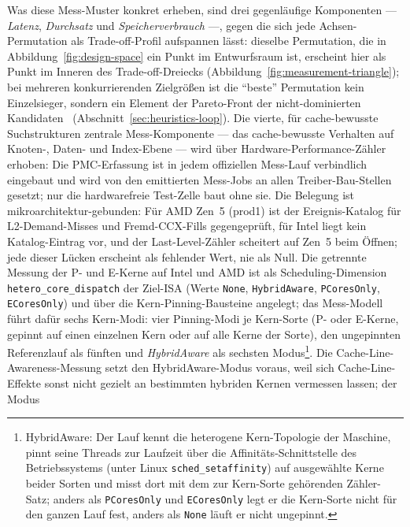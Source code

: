 \begin{nurlang}
Was diese Mess-Muster konkret erheben, sind drei gegenläufige Komponenten --- \emph{Latenz},
\emph{Durchsatz} und \emph{Speicherverbrauch} ---, gegen die sich jede Achsen-Permutation als
Trade-off-Profil aufspannen lässt: dieselbe Permutation, die in Abbildung~\ref{fig:design-space} ein Punkt
im Entwurfsraum ist, erscheint hier als Punkt im Inneren des Trade-off-Dreiecks
(Abbildung~\ref{fig:measurement-triangle}); bei mehreren konkurrierenden Zielgrößen ist die
\enquote{beste} Permutation kein Einzelsieger, sondern ein Element der Pareto-Front der
nicht-dominierten Kandidaten~\cite{ehrgott2005multicriteria} (Abschnitt~\ref{sec:heuristics-loop}). Die
vierte, für cache-bewusste Suchstrukturen zentrale Mess-Komponente --- das cache-bewusste Verhalten auf
Knoten-, Daten- und Index-Ebene --- wird über Hardware-Performance-Zähler erhoben: Die PMC-Erfassung ist
in jedem offiziellen Mess-Lauf verbindlich eingebaut und wird von den emittierten Mess-Jobs an allen
Treiber-Bau-Stellen gesetzt; nur die hardwarefreie Test-Zelle baut ohne sie. Die Belegung ist
mikroarchitektur-gebunden: Für AMD Zen~5 (prod1) ist der Ereignis-Katalog für L2-Demand-Misses und
Fremd-CCX-Fills gegengeprüft, für Intel liegt kein Katalog-Eintrag vor, und der
Last-Level-Zähler scheitert auf Zen~5 beim Öffnen; jede dieser Lücken erscheint als fehlender Wert, nie
als Null.
Die getrennte Messung der P- und E-Kerne auf Intel und AMD ist als Scheduling-Dimension
\texttt{hetero\_core\_dispatch} der Ziel-ISA (Werte \texttt{None}, \texttt{HybridAware},
\texttt{PCoresOnly}, \texttt{ECoresOnly}) und über die Kern-Pinning-Bausteine angelegt; das Mess-Modell
führt dafür sechs Kern-Modi: vier Pinning-Modi je Kern-Sorte (P- oder E-Kerne, gepinnt auf einen
einzelnen Kern oder auf alle Kerne der Sorte), den ungepinnten Referenzlauf als fünften und
\emph{HybridAware} als sechsten Modus\footnote{HybridAware: Der Lauf kennt die heterogene
Kern-Topologie der Maschine, pinnt seine Threads zur Laufzeit über die Affinitäts-Schnittstelle des
Betriebssystems (unter Linux \texttt{sched\_setaffinity}) auf ausgewählte Kerne beider Sorten und
misst dort mit dem zur Kern-Sorte gehörenden Zähler-Satz; anders als \texttt{PCoresOnly} und
\texttt{ECoresOnly} legt er die Kern-Sorte nicht für den ganzen Lauf fest, anders als \texttt{None}
läuft er nicht ungepinnt.}. Die Cache-Line-Awareness-Messung setzt den HybridAware-Modus voraus, weil
sich Cache-Line-Effekte sonst nicht gezielt an bestimmten hybriden Kernen vermessen lassen; der Modus

\end{nurlang}
